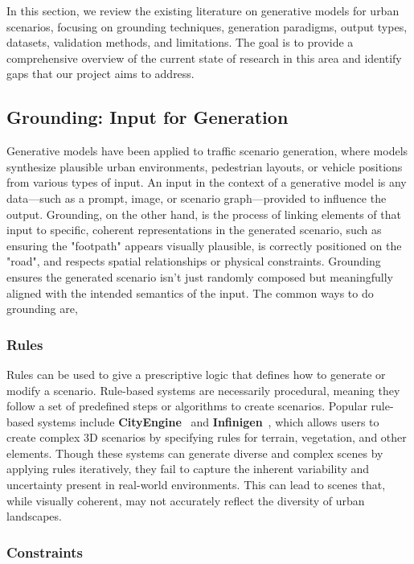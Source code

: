 \documentclass{article}
\begin{document}
In this section, we review the existing literature on generative models for urban scenarios, focusing on grounding techniques, generation paradigms, output types, datasets, validation methods, and limitations. The goal is to provide a comprehensive overview of the current state of research in this area and identify gaps that our project aims to address. 

\subsection{Grounding: Input for Generation}

Generative models have been applied to traffic scenario generation, where models synthesize plausible urban environments, pedestrian layouts, or vehicle positions from various types of input. An input in the context of a generative model is any data—such as a prompt, image, or scenario graph—provided to influence the output. Grounding, on the other hand, is the process of linking elements of that input to specific, coherent representations in the generated scenario, such as ensuring the "footpath" appears visually plausible, is correctly positioned on the "road", and respects spatial relationships or physical constraints. Grounding ensures the generated scenario isn't just randomly composed but meaningfully aligned with the intended semantics of the input. The common ways to do grounding are,

\subsubsection{Rules}

Rules can be used to give a prescriptive logic that defines how to generate or modify a scenario. Rule-based systems are necessarily procedural, meaning they follow a set of predefined steps or algorithms to create scenarios. Popular rule-based systems include \textbf{CityEngine}~\cite{parish2001procedural} and \textbf{Infinigen}~\cite{raistrick2023infinite}, which allows users to create complex 3D scenarios by specifying rules for terrain, vegetation, and other elements. Though these systems can generate diverse and complex scenes by applying rules iteratively, they fail to capture the inherent variability and uncertainty present in real-world environments. This can lead to scenes that, while visually coherent, may not accurately reflect the diversity of urban landscapes.

\subsubsection{Constraints}
\end{document}
